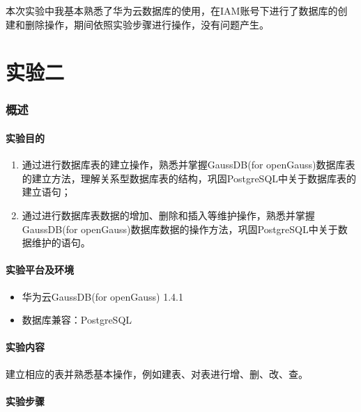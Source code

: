 \documentclass[lang=cn,11pt,a4paper,cite=authornum]{paper}
\begin{document}
本次实验中我基本熟悉了华为云数据库的使用，在IAM账号下进行了数据库的创建和删除操作，期间依照实验步骤进行操作，没有问题产生。

\part{实验二}

\section{概述}

\subsection{实验目的}

\begin{enumerate}
    \item 通过进行数据库表的建立操作，熟悉并掌握GaussDB(for openGauss)数据库表的建立方法，理解关系型数据库表的结构，巩固PostgreSQL中关于数据库表的建立语句；
    \item 通过进行数据库表数据的增加、删除和插入等维护操作，熟悉并掌握GaussDB(for openGauss)数据库数据的操作方法，巩固PostgreSQL中关于数据维护的语句。
\end{enumerate}

\subsection{实验平台及环境}

\begin{itemize}
    \item 华为云GaussDB(for openGauss) 1.4.1
    \item 数据库兼容：PostgreSQL
\end{itemize}

\subsection{实验内容}

建立相应的表并熟悉基本操作，例如建表、对表进行增、删、改、查。

\subsection{实验步骤}
\end{document}
